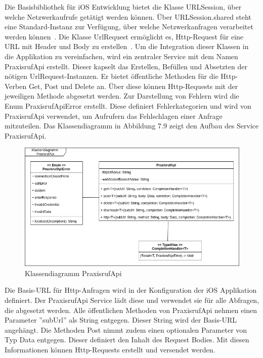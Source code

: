 Die Basisbibliothek für iOS Entwicklung bietet die Klasse URLSession, über welche Netzwerkaufrufe getätigt werden können.
Über URLSession.shared steht eine Standard-Instanz zur Verfügung, über welche Netzwerkanfragen verarbeitet werden können~\cite{ios_urlsession}.
Die Klasse UrlRequest ermöglicht es, Http-Request für eine URL mit Header und Body zu erstellen~\cite{ios_urlrequest}.
Um die Integration dieser Klassen in die Applikation zu vereinfachen, wird ein zentraler Service mit dem Namen PraxisrufApi erstellt.
Dieser kapselt das Erstellen, Befüllen und Absetzten der nötigen UrlRequest-Instanzen.
Er bietet öffentliche Methoden für die Http-Verben Get, Post und Delete an.
Über diese können Http-Requests mit der jeweiligen Methode abgesetzt werden.
Zur Darstellung von Fehlern wird die Enum PraxisrufApiError erstellt.
Diese definiert Fehlerkategorien und wird von PraxisrufApi verwendet, um Aufrufern das Fehlschlagen einer Anfrage mitzuteilen.
Das Klassendiagramm in Abbildung 7.9 zeigt den Aufbau des Service PraxisrufApi\@.

\begin{figure}[h]
    \centering
    \begin{minipage}[b]{0.8\textwidth}
        \includegraphics[width=\textwidth]{graphics/diagramms/Class_PraxisrufAPI}
        \caption{Klassendiagramm PraxisrufApi}
    \end{minipage}
\end{figure}

Die Basis-URL für Http-Anfragen wird in der Konfiguration der iOS Applikation definiert.
Der PraxisrufApi Service lädt diese und verwendet sie für alle Abfragen, die abgesetzt werden.
Alle öffentlichen Methoden von PraxisrufApi nehmen einen Parameter ''subUrl'' als String entgegen.
Dieser String wird der Basis-URL angehängt.
Die Methoden Post nimmt zudem einen optionalen Parameter von Typ Data entgegen.
Dieser definiert den Inhalt des Request Bodies.
Mit diesen Informationen können Http-Requests erstellt und versendet werden.

